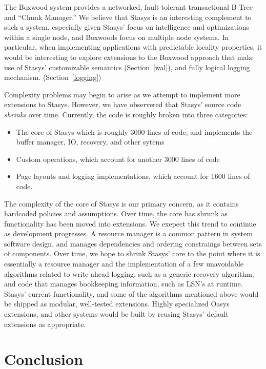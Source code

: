 \documentclass[letterpaper,twocolumn,10pt]{article}
\newcommand{\yad}{Stasys\xspace}
\newcommand{\yads}{Stasys'\xspace}
\newcommand{\oasys}{Oasys\xspace}
\begin{document}
The Boxwood system provides a networked, fault-tolerant transactional
B-Tree and ``Chunk Manager.''  We believe that \yad is an interesting
complement to such a system, especially given \yads focus on
intelligence and optimizations within a single node, and Boxwoods
focus on multiple node systems.  In particular, when implementing
applications with predictable locality properties, it would be
interesting to explore extensions to the Boxwood approach that make
use of \yads customizable semantics (Section~\ref{wal}), and fully logical logging
mechanism. (Section~\ref{logging})

Complexity problems may begin to arise as we attempt to implement more
extensions to \yad.  However, we have observered that \yads source
code {\em shrinks} over time.  Currently, the code is roughly broken
into three categories:
\begin{itemize}
\item The core of \yad which is roughly 3000 lines
of code, and implements the buffer manager, IO, recovery, and other
sytems
\item Custom operations, which account for another 3000 lines of code
\item Page layouts and logging implementations, which account for 1600 lines of code.
\end{itemize}

The complexity of the core of \yad is our primary concern, as it
contains hardcoded policies and assumptions.  Over time, the core has
shrunk as functionality has been moved into extensions.  We exepect
this trend to continue as development progresses.  A resource manager
is a common pattern in system software design, and manages
dependencies and ordering constraings between sets of components.
Over time, we hope to shrink \yads core to the point where it is
essentially a resource manager and the implementation of a few unavoidable
algorithms related to write-ahead logging, such as a generic recovery
algorithm, and code that manages bookkeeping information, such as 
LSN's at runtime.  \yads current functionality, and some of the algorithms
mentioned above would be shipped as modular, well-tested extensions.
Highly specialized \oasys extensions, and other systems would be built
by reusing \yads default extensions as appropriate.


\section{Conclusion}
\end{document}
